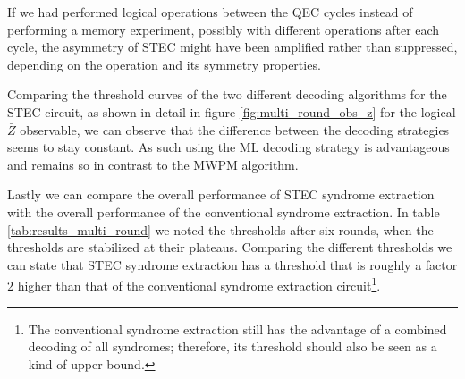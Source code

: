 If we had performed logical operations between the QEC cycles instead of performing a memory experiment,
possibly with different operations after each cycle,
the asymmetry of STEC might have been amplified rather than suppressed,
depending on the operation and its symmetry properties.

Comparing the threshold curves of the two different decoding algorithms for the STEC circuit, as shown in detail in figure \ref{fig:multi_round_obs_z} for the logical $\bar{Z}$ observable,
we can observe that the difference between the decoding strategies seems to stay constant.
As such using the ML decoding strategy is advantageous and remains so in contrast to the MWPM algorithm.

Lastly we can compare the overall performance of STEC syndrome extraction with the overall performance of the conventional syndrome extraction.
In table \ref{tab:results_multi_round} we noted the thresholds after six rounds, when the thresholds are stabilized at their plateaus. 
Comparing the different thresholds we can state that STEC syndrome extraction has a threshold that is roughly a factor $2$ higher than that of the conventional syndrome extraction circuit\footnote{
    The conventional syndrome extraction still has the advantage of a combined decoding of all syndromes; therefore, its threshold should also be seen as a kind of upper bound.
}.


